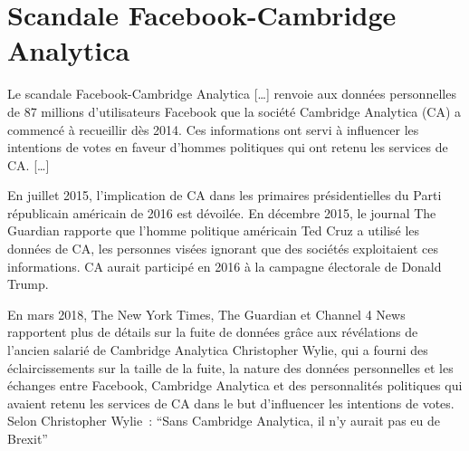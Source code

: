 \section{Scandale Facebook-Cambridge Analytica}

Le scandale Facebook-Cambridge Analytica […] renvoie aux données personnelles de 87 millions d'utilisateurs Facebook que la société Cambridge Analytica (CA) a commencé à recueillir dès 2014. Ces informations ont servi à influencer les intentions de votes en faveur d'hommes politiques qui ont retenu les services de CA. […]

En juillet 2015, l'implication de CA dans les primaires présidentielles du Parti républicain américain de 2016 est dévoilée. En décembre 2015, le journal The Guardian rapporte que l'homme politique américain Ted Cruz a utilisé les données de CA, les personnes visées ignorant que des sociétés exploitaient ces informations. CA aurait participé en 2016 à la campagne électorale de Donald Trump.

En mars 2018, The New York Times, The Guardian et Channel 4 News rapportent plus de détails sur la fuite de données grâce aux révélations de l'ancien salarié de Cambridge Analytica Christopher Wylie, qui a fourni des éclaircissements sur la taille de la fuite, la nature des données personnelles et les échanges entre Facebook, Cambridge Analytica et des personnalités politiques qui avaient retenu les services de CA dans le but d'influencer les intentions de votes. Selon Christopher Wylie : \enquote{Sans Cambridge Analytica, il n'y aurait pas eu de Brexit} 
